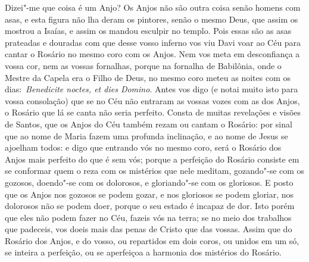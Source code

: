 Dizei"-me que coisa é um Anjo? Os Anjos não são outra coisa
senão homens com asas, e esta figura não lha deram os pintores, senão o
mesmo Deus, que assim os mostrou a Isaías, e assim os mandou esculpir no
templo. Pois essas são as asas prateadas e douradas com que desse vosso
inferno vos viu Davi voar ao Céu para cantar o Rosário no mesmo coro com
os Anjos. Nem vos meta em desconfiança a vossa cor, nem as vossas
fornalhas, porque na fornalha de Babilônia, onde o Mestre da Capela era
o Filho de Deus, no mesmo coro meteu as noites com os
dias:~\emph{Benedicite noctes, et dies Domino}. Antes
vos digo (e notai muito isto para vossa consolação) que se no Céu não
entraram as vossas vozes com as dos Anjos, o Rosário que lá se canta não
seria perfeito. Consta de muitas revelações e visões de Santos, que os
Anjos do Céu também rezam ou cantam o Rosário: por sinal que ao nome de
Maria fazem uma profunda inclinação, e ao nome de Jesus se ajoelham
todos: e digo que entrando vós no mesmo coro, será o Rosário dos Anjos
mais perfeito do que é sem vós; porque a perfeição do Rosário consiste
em se conformar quem o reza com os mistérios que nele meditam,
gozando"-se com os gozosos, doendo"-se com os dolorosos, e gloriando"-se
com os gloriosos. E posto que os Anjos nos gozosos se podem gozar, e nos
gloriosos se podem gloriar, nos dolorosos não se podem doer, porque o
seu estado é incapaz de dor. Isto porém que eles não podem fazer no Céu,
fazeis vós na terra; se no meio dos trabalhos que padeceis, vos doeis
mais das penas de Cristo que das vossas. Assim que do Rosário dos Anjos,
e do vosso, ou repartidos em dois coros, ou unidos em um só, se inteira
a perfeição, ou se aperfeiçoa a harmonia dos mistérios do Rosário.

